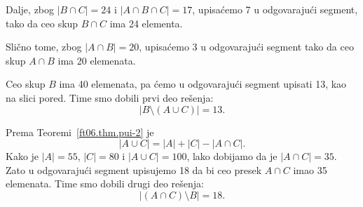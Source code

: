 \medskip

\noindent
\begin{minipage}{3in}
  Dalje, zbog $|B \cap C| = 24$ i $|A \cap B \cap C| = 17$, upisa\'cemo 7 u odgovaraju\'ci segment,
  tako da ceo skup $B \cap C$ ima 24 elementa.
\end{minipage}
\hfill
\begin{minipage}{2.5in}
  \begin{center}
    
  \end{center}
\end{minipage}

\medskip

\noindent
\begin{minipage}{3in}
  Sli\v cno tome, zbog $|A \cap B| = 20$, upisa\'cemo 3 u odgovaraju\'ci segment
  tako da ceo skup $A \cap B$ ima 20 elemenata.
\end{minipage}
\hfill
\begin{minipage}{2.5in}
  \begin{center}
    
  \end{center}
\end{minipage}

\medskip

\noindent
\begin{minipage}{3in}
  Ceo skup $B$ ima 40 elemenata, pa \'cemo u odgovaraju\'ci segment upisati 13, kao na slici pored.
  Time smo dobili prvi deo re\v senja:
  $$
    |B \setminus (A \cup C)| = 13.
  $$
\end{minipage}
\hfill
\begin{minipage}{2.5in}
  \begin{center}
    
  \end{center}
\end{minipage}

\medskip

\noindent
\begin{minipage}{3in}
  Prema Teoremi~\ref{ft06.thm.pui-2} je
  $$
    |A \cup C| = |A| + |C| - |A \cap C|.
  $$
  Kako je $|A| = 55$, $|C| = 80$ i $|A \cup C| = 100$, lako
  dobijamo da je $|A \cap C| = 35$. Zato u odgovaraju\'ci segment upisujemo 18
  da bi ceo presek $A \cap C$ imao 35 elemenata. Time smo dobili drugi deo re\v senja:
  $$
    |(A \cap C) \setminus B| = 18.
  $$
\end{minipage}
\hfill
\begin{minipage}{2.5in}
  \begin{center}
    
  \end{center}
\end{minipage}

